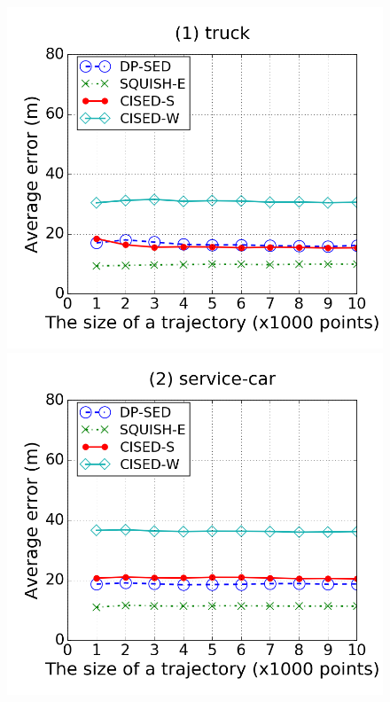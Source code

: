 \begin{figure}[tb!]
\centering
\includegraphics[scale = 0.250]{figures/Exp-error-size-truck.png}
\includegraphics[scale = 0.250]{figures/Exp-error-size-service.png}

\end{figure}
